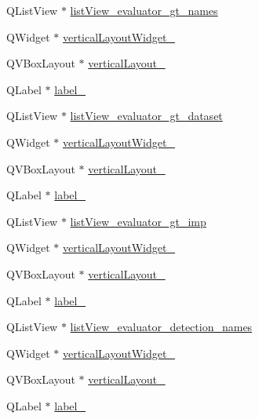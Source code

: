\begin{DoxyCompactItemize}
Q\+List\+View $\ast$ \hyperlink{class_ui___main_window_a193da7f2274472ba5e33b831282a90d9}{list\+View\+\_\+evaluator\+\_\+gt\+\_\+names}
\item 
Q\+Widget $\ast$ \hyperlink{class_ui___main_window_acbafa1a60e5ef3d6b972bede67eaf4e3}{vertical\+Layout\+Widget\+\_}
\item 
Q\+V\+Box\+Layout $\ast$ \hyperlink{class_ui___main_window_ab35de77115e747d4efa5ecde01d9c16a}{vertical\+Layout\+\_}
\item 
Q\+Label $\ast$ \hyperlink{class_ui___main_window_a1c16c0a684617927472e534822a63c7d}{label\+\_}
\item 
Q\+List\+View $\ast$ \hyperlink{class_ui___main_window_aff2d25f2b5ecb1f4e9524ee9644fc77b}{list\+View\+\_\+evaluator\+\_\+gt\+\_\+dataset}
\item 
Q\+Widget $\ast$ \hyperlink{class_ui___main_window_a9b8ad7344d360d8c810fac6cfa4beb0f}{vertical\+Layout\+Widget\+\_}
\item 
Q\+V\+Box\+Layout $\ast$ \hyperlink{class_ui___main_window_a8cf1c6ec21e85d25d8ff8cfc84652568}{vertical\+Layout\+\_}
\item 
Q\+Label $\ast$ \hyperlink{class_ui___main_window_a882200d8ae16962f5dd3b749ebacbf7e}{label\+\_}
\item 
Q\+List\+View $\ast$ \hyperlink{class_ui___main_window_a98957c16bedd43221d77e7530cd8b3ad}{list\+View\+\_\+evaluator\+\_\+gt\+\_\+imp}
\item 
Q\+Widget $\ast$ \hyperlink{class_ui___main_window_a0c938b63cd032ba27b9fd8e4b0cf98b3}{vertical\+Layout\+Widget\+\_}
\item 
Q\+V\+Box\+Layout $\ast$ \hyperlink{class_ui___main_window_a04ce3ef61cc4b4fb628b2a258275f5ef}{vertical\+Layout\+\_}
\item 
Q\+Label $\ast$ \hyperlink{class_ui___main_window_ab6ac4329a89041f557332f6569d94493}{label\+\_}
\item 
Q\+List\+View $\ast$ \hyperlink{class_ui___main_window_ab08d539aa785bc82d717afad6a36add7}{list\+View\+\_\+evaluator\+\_\+detection\+\_\+names}
\item 
Q\+Widget $\ast$ \hyperlink{class_ui___main_window_ad831d9a52363a187f4b05a92d4ac409b}{vertical\+Layout\+Widget\+\_}
\item 
Q\+V\+Box\+Layout $\ast$ \hyperlink{class_ui___main_window_ad9eb495f2ef1fdec850aca1c0ea2088c}{vertical\+Layout\+\_}
\item 
Q\+Label $\ast$ \hyperlink{class_ui___main_window_a1f4ff90c122fededcc08604401442034}{label\+\_}

\end{DoxyCompactItemize}

